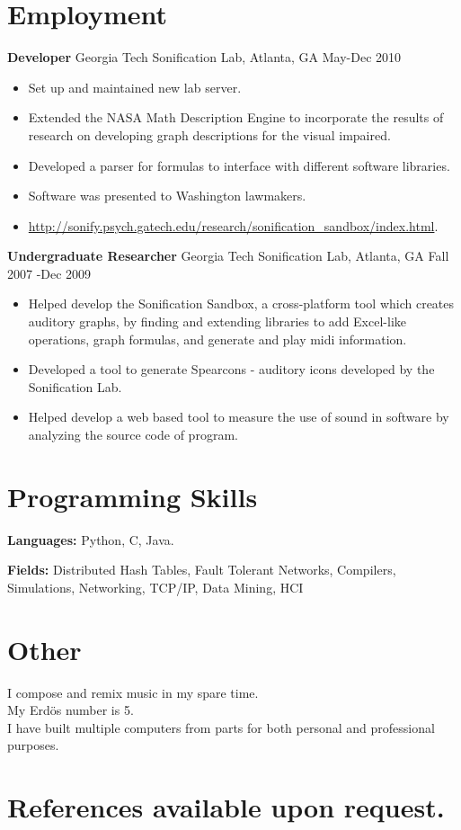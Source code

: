 \documentclass{res}
\begin{document}
\begin{resume}
\section{Employment}
% 
{\bf Developer} Georgia Tech Sonification Lab, Atlanta, GA May-Dec 2010
	\begin{itemize}
		\item Set up and maintained new lab server.
		\item Extended the NASA Math Description Engine to incorporate the results of research on developing graph descriptions for the visual impaired.
		\item Developed a parser for formulas to interface with different software libraries.
		\item Software was presented to Washington lawmakers.
		\item \url{http://sonify.psych.gatech.edu/research/sonification_sandbox/index.html}.
    \end{itemize}      
    
{\bf Undergraduate Researcher} Georgia Tech Sonification Lab, Atlanta, GA Fall 2007 -Dec 2009
	\begin{itemize}
		\item Helped develop the Sonification Sandbox, a cross-platform tool which creates auditory graphs, by finding and extending libraries to add Excel-like operations, graph formulas, and generate and play midi information.
		\item Developed a tool to generate Spearcons - auditory icons developed by the Sonification Lab.
		\item Helped develop a web based tool to measure the use of sound in software by analyzing the source code of program.
    \end{itemize}      
    

\section{Programming Skills}
{\bf Languages:} Python, C, Java.

{\bf Fields:} Distributed Hash Tables, Fault Tolerant Networks, Compilers, Simulations, Networking, TCP/IP, Data Mining,  HCI

\section{Other}
I compose and remix music in my spare time. \\
My Erd\"{o}s number is 5.\\
I have built multiple computers from parts for both personal and professional purposes.



\end{resume} 
\section{References available upon request.}
\end{document}
